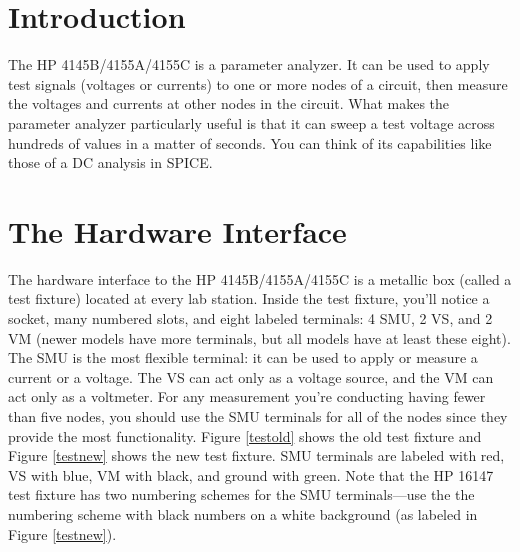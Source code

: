 \documentclass{article}
\begin{document}
\thispagestyle{plain}


\tableofcontents

\section{Introduction}

The HP 4145B/4155A/4155C is a parameter analyzer. It can be used to apply test signals (voltages or currents) to one or more nodes of a circuit, then measure the voltages and currents at other nodes in the circuit. What makes the parameter analyzer particularly useful is that it can sweep a test voltage across hundreds of values in a matter of seconds. You can think of its capabilities like those of a DC analysis in SPICE.

\section{The Hardware Interface}

The hardware interface to the HP 4145B/4155A/4155C is a metallic box (called a test fixture) located at every lab station. Inside the test fixture, you'll notice a socket, many numbered slots, and eight labeled terminals: 4 SMU, 2 VS, and 2 VM (newer models have more terminals, but all models have at least these eight). The SMU is the most flexible terminal: it can be used to apply or measure a current or a voltage. The VS can act only as a voltage source, and the VM can act only as a voltmeter. For any measurement you're conducting having fewer than five nodes, you should use the SMU terminals for all of the nodes since they provide the most functionality. Figure \ref{testold} shows the old test fixture and Figure \ref{testnew} shows the new test fixture. SMU terminals are labeled with red, VS with blue, VM with black, and ground with green. Note that the HP 16147 test fixture has two numbering schemes for the SMU terminals---use the the numbering scheme with black numbers on a white background (as labeled in Figure \ref{testnew}).
\end{document}
